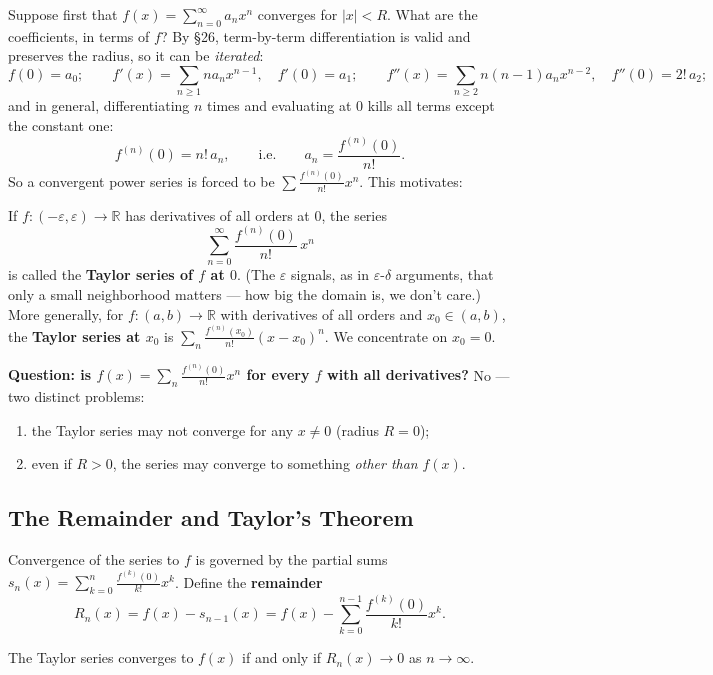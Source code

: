 \documentclass[11pt]{report}
\begin{document}
Suppose first that $f(x) = \sum_{n=0}^\infty a_n x^n$ converges for $|x| < R$. What are the coefficients, in terms of $f$? By \S 26, term-by-term differentiation is valid and preserves the radius, so it can be \emph{iterated}:
\[
f(0) = a_0; \qquad f'(x) = \sum_{n\geq1} n a_n x^{n-1}, \quad f'(0) = a_1; \qquad f''(x) = \sum_{n \geq 2} n(n-1) a_n x^{n-2}, \quad f''(0) = 2! \, a_2;
\]
and in general, differentiating $n$ times and evaluating at $0$ kills all terms except the constant one:
\[
f^{(n)}(0) = n!\, a_n, \qquad \text{i.e.} \qquad a_n = \frac{f^{(n)}(0)}{n!}.
\]
So a convergent power series is forced to be $\sum \tfrac{f^{(n)}(0)}{n!} x^n$. This motivates:

\begin{defbox}
If $f: (-\varepsilon, \varepsilon) \to \mathbb{R}$ has derivatives of all orders at $0$, the series
\[
\sum_{n=0}^\infty \frac{f^{(n)}(0)}{n!}\, x^n
\]
is called the \textbf{Taylor series of $f$ at $0$}. (The $\varepsilon$ signals, as in $\varepsilon$-$\delta$ arguments, that only a small neighborhood matters --- how big the domain is, we don't care.) More generally, for $f: (a,b) \to \mathbb{R}$ with derivatives of all orders and $x_0 \in (a,b)$, the \textbf{Taylor series at $x_0$} is $\sum_n \tfrac{f^{(n)}(x_0)}{n!} (x - x_0)^n$. We concentrate on $x_0 = 0$.
\end{defbox}

\textbf{Question: is $f(x) = \sum_n \tfrac{f^{(n)}(0)}{n!}x^n$ for every $f$ with all derivatives?} No --- two distinct problems:
\begin{enumerate}[label=(\arabic*)]
    \item the Taylor series may not converge for any $x \neq 0$ (radius $R = 0$);
    \item even if $R > 0$, the series may converge to something \emph{other than} $f(x)$.
\end{enumerate}

\subsection{The Remainder and Taylor's Theorem}

Convergence of the series to $f$ is governed by the partial sums $s_n(x) = \sum_{k=0}^{n} \tfrac{f^{(k)}(0)}{k!}x^k$. Define the \textbf{remainder}
\[
R_n(x) = f(x) - s_{n-1}(x) = f(x) - \sum_{k=0}^{n-1} \frac{f^{(k)}(0)}{k!} x^k.
\]

\begin{propbox}
The Taylor series converges to $f(x)$ if and only if $R_n(x) \to 0$ as $n \to \infty$.
\end{propbox}
\end{document}
